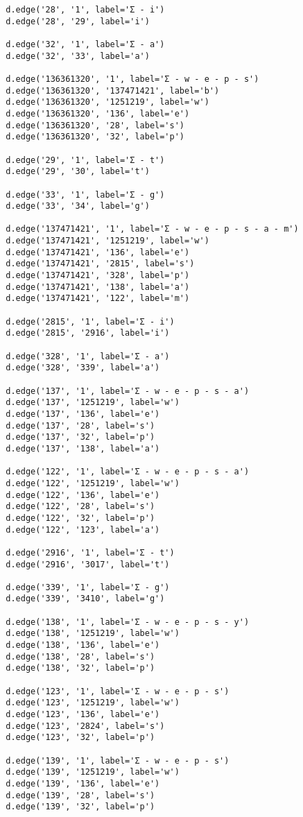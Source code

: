 \documentclass{article}
\begin{document}
\begin{lstlisting}
		d.edge('28', '1', label='Σ - i')
		d.edge('28', '29', label='i')
		
		d.edge('32', '1', label='Σ - a')
		d.edge('32', '33', label='a')
		
		d.edge('136361320', '1', label='Σ - w - e - p - s')
		d.edge('136361320', '137471421', label='b')
		d.edge('136361320', '1251219', label='w')
		d.edge('136361320', '136', label='e')
		d.edge('136361320', '28', label='s')
		d.edge('136361320', '32', label='p')
		
		d.edge('29', '1', label='Σ - t')
		d.edge('29', '30', label='t')
		
		d.edge('33', '1', label='Σ - g')
		d.edge('33', '34', label='g')
		
		d.edge('137471421', '1', label='Σ - w - e - p - s - a - m')
		d.edge('137471421', '1251219', label='w')
		d.edge('137471421', '136', label='e')
		d.edge('137471421', '2815', label='s')
		d.edge('137471421', '328', label='p')
		d.edge('137471421', '138', label='a')
		d.edge('137471421', '122', label='m')
		
		d.edge('2815', '1', label='Σ - i')
		d.edge('2815', '2916', label='i')
		
		d.edge('328', '1', label='Σ - a')
		d.edge('328', '339', label='a')
		
		d.edge('137', '1', label='Σ - w - e - p - s - a')
		d.edge('137', '1251219', label='w')
		d.edge('137', '136', label='e')
		d.edge('137', '28', label='s')
		d.edge('137', '32', label='p')
		d.edge('137', '138', label='a')
		
		d.edge('122', '1', label='Σ - w - e - p - s - a')
		d.edge('122', '1251219', label='w')
		d.edge('122', '136', label='e')
		d.edge('122', '28', label='s')
		d.edge('122', '32', label='p')
		d.edge('122', '123', label='a')
		
		d.edge('2916', '1', label='Σ - t')
		d.edge('2916', '3017', label='t')
		
		d.edge('339', '1', label='Σ - g')
		d.edge('339', '3410', label='g')
		
		d.edge('138', '1', label='Σ - w - e - p - s - y')
		d.edge('138', '1251219', label='w')
		d.edge('138', '136', label='e')
		d.edge('138', '28', label='s')
		d.edge('138', '32', label='p')
		
		d.edge('123', '1', label='Σ - w - e - p - s')
		d.edge('123', '1251219', label='w')
		d.edge('123', '136', label='e')
		d.edge('123', '2824', label='s')
		d.edge('123', '32', label='p')
		
		d.edge('139', '1', label='Σ - w - e - p - s')
		d.edge('139', '1251219', label='w')
		d.edge('139', '136', label='e')
		d.edge('139', '28', label='s')
		d.edge('139', '32', label='p')
		

\end{lstlisting}
\end{document}

